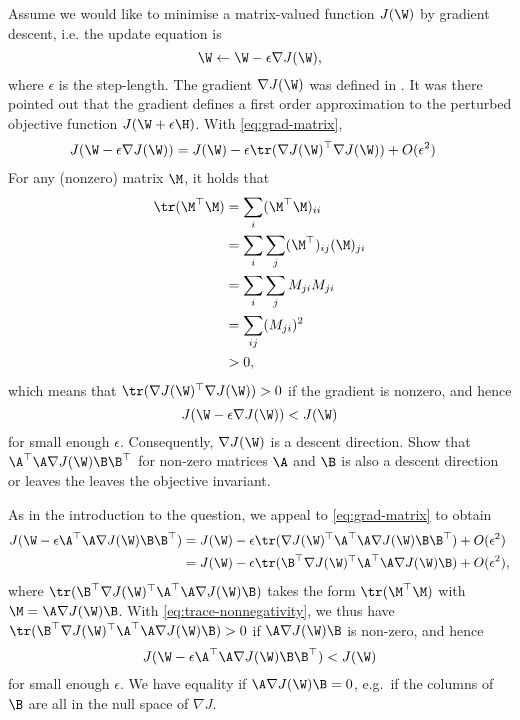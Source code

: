 \label{ex:descent-directions-for-matrix-valued-functions}
Assume we would like to minimise a matrix-valued function $J(\W)$ by gradient
descent, i.e. the update equation is
\begin{equation}
  \W \leftarrow \W - \epsilon \nabla J(\W),
\end{equation}
where $\epsilon$ is the step-length. The gradient $\nabla J(\W)$ was defined in
. It was there pointed out that the gradient defines a
first order approximation to the perturbed objective function $J(\W+\epsilon
\H)$. With \eqref{eq:grad-matrix},
\begin{align}
  J(\W - \epsilon \nabla J(\W)) & = J(\W) - \epsilon \tr(\nabla J(\W)^\top \nabla J(\W)) + O(\epsilon^2)
\end{align}
For any (nonzero) matrix $\M$, it holds that
\begin{align}
  \tr(\M^\top \M) &= \sum_{i} (\M^\top\M)_{ii}\\
                  &= \sum_i \sum_j (\M^\top)_{ij} (\M)_{ji}\\
                  &= \sum_i \sum_j M_{ji} M_{ji}\\
                  &= \sum_{ij} (M_{ji})^2\\
                  &> 0, \label{eq:trace-nonnegativity}
\end{align}
which means that $\tr(\nabla J(\W)^\top \nabla J(\W)) > 0$ if the gradient is nonzero, and hence
\begin{equation}
  J(\W - \epsilon \nabla J(\W)) < J(\W)
\end{equation}
for small enough $\epsilon$. Consequently, $\nabla J(\W)$ is a descent
direction. Show that $\A^\top \A \nabla J(\W)\B\B^\top$ for non-zero matrices
$\A$ and $\B$ is also a descent direction or leaves the leaves the objective invariant.

\begin{solution}
  As in the introduction to the question, we appeal to \eqref{eq:grad-matrix} to
  obtain
  \begin{align}
    J(\W - \epsilon \A^\top \A \nabla J(\W) \B\B^\top) & = J(\W) - \epsilon \tr(\nabla J(\W)^\top \A^\top \A \nabla J(\W)\B\B^\top) + O(\epsilon^2)\\
                                                     & =  J(\W) - \epsilon \tr(\B^\top \nabla J(\W)^\top \A^\top \A \nabla J(\W)\B) + O(\epsilon^2),
  \end{align}
  where $\tr(\B^\top \nabla J(\W)^\top\A^\top \A \nabla J(\W)\B)$ takes the form
  $\tr(\M^\top \M)$ with $\M= \A \nabla J(\W)\B$. With
  \eqref{eq:trace-nonnegativity}, we thus have $\tr(\B^\top \nabla J(\W)^\top \A^\top
  \A \nabla J(\W)\B) > 0$ if $\A \nabla J(\W)\B$ is non-zero, and hence
  \begin{equation}
    J(\W - \epsilon \A^\top \A \nabla J(\W) \B\B^\top) < J(\W)
  \end{equation}
  for small enough $\epsilon$. We have equality if $\A \nabla J(\W)\B = 0$,
  e.g.\ if the columns of $\B$ are all in the null space of $\nabla J$.
\end{solution}






